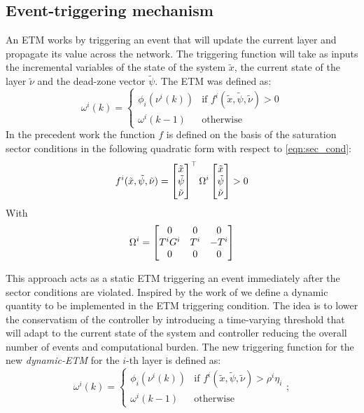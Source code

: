 \documentclass{ifacconf}
\theoremstyle{plain}
\begin{document}
\subsection{Event-triggering mechanism}
An ETM works by triggering an event that will update the current layer and propagate its value across the network. The triggering function will take as inputs the incremental variables of the state of the system 
$\tilde{x}$, the current state of the layer $\tilde{\nu}$ and the dead-zone vector $\tilde{\psi}$. The ETM was defined as:
\begin{equation}
  \omega^{i}(k) = \begin{cases}
    \phi_i(\nu^i(k)) & \text{if } f^i(\tilde{x}, \tilde{\psi}, \tilde{\nu}) > 0\\
    \omega^{i}(k-1) & \text{otherwise}
  \end{cases}
\end{equation}
In the precedent work \cite{css-extended} the function $f$ is defined on the basis of the saturation sector conditions in the following quadratic form with respect to \eqref{eqn:sec_cond}:
\begin{equation}\label{eqn:base_omega}
  f^i(\tilde{x}, \tilde{\psi}, \tilde{\nu}) =
  \left[\begin{matrix}\tilde{x}\\ \tilde{\psi} \\ \tilde{\nu}\end{matrix}\right]^\top
  \Omega^i
  \left[\begin{matrix}\tilde{x}\\ \tilde{\psi} \\ \tilde{\nu}\end{matrix}\right] > 0
\end{equation}
With $$
\Omega^i =  \left[\begin{matrix}
    0 & 0 & 0\\
    T^i G^i & T^i & -T^i\\
    0 & 0 & 0
  \end{matrix}\right] 
$$

This approach acts as a static ETM triggering an event immediately after the sector conditions are violated. Inspired by the work of \cite{data-driven} we define a dynamic quantity to be implemented in the ETM triggering condition. The idea is to lower the conservatism of the controller by introducing a time-varying threshold that will adapt to the current state of the system and controller reducing the overall number of events and computational burden. The new triggering function for the new \emph{dynamic-ETM} for the $i$-th layer is defined as:
\begin{equation}\label{eqn:dynamic_trig}
  \omega^{i}(k) = \begin{cases}
    \phi_i(\nu^i(k)) & \text{if } f^i(\tilde{x}, \tilde{\psi}, \tilde{\nu}) > \rho^i \eta_i\\
    \omega^{i}(k-1) & \text{otherwise}
  \end{cases};
\end{equation}
\end{document}
